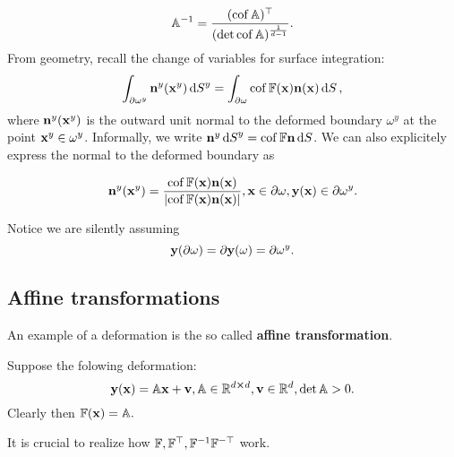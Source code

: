 \documentclass[11pt]{scrartcl} %
\begin{document}
\begin{equation}
    \label{eqn:invbetter}
    \mathbb{A}^{-1} = \frac{(\operatorname{cof} \mathbb{A})^\top}{(\det \operatorname{cof} \mathbb{A})^{\frac{1}{d-1}}}.
\end{equation}
From geometry, recall the change of variables for surface integration:
\[
	\int_{\partial \omega^y}\vb{n}^y\qty(\vb{x}^{y}) \dd{S}^y = \int_{\partial \omega}\operatorname{cof} \mathbb{F}\qty(\vb{x})\vb{n}\qty(\vb{x}) \dd{S},
\]
where $\vb{n}^y\qty(\vb{x}^{y})$ is the outward unit normal to the deformed boundary $\omega^y$ at the point $\vb{x}^{y} \in \omega^{y}$. Informally, we write $\vb{n}^y \dd{S}^y = \operatorname{cof} \mathbb{F} \vb{n} \dd{S}$. We can also explicitely express the normal to the deformed boundary as

\begin{equation}
    \label{eqn:deformed_normal}
    \vb{n}^y(\vb{x}^y)=\frac{\operatorname{cof} \mathbb{F} (\vb{x}) \vb{n}(\vb{x})}{\abs{\operatorname{cof} \mathbb{F}(\vb{x}) \vb{n}(\vb{x})}}, \vb{x} \in \partial \omega, \vb{y}(\vb{x}) \in \partial \omega^y.
\end{equation}

Notice we are silently assuming
\[
	\vb{y}\qty(\partial \omega) = \partial \vb{y}\qty(\omega) = \partial \omega^{y}.
\]

\subsection{Affine transformations}
\label{sec:affine_transf}
An example of a deformation is the so called \textbf{affine transformation}.
\begin{example}
	Suppose the folowing deformation:
	\[
		\vb{y}(\vb{x}) = \mathbb{A} \vb{x} + \vb{v}, \mathbb{A}\in {\mathbb R}^{d \cross d}, \vb{v} \in {\mathbb R}^d, \det \mathbb{A} > 0.
	\]
	Clearly then $\mathbb{F}(\vb{x}) = \mathbb{A}.$
\end{example}
It is crucial to realize how $\mathbb{F}, \mathbb{F}^\top, \mathbb{F}^{-1} \mathbb{F}^{-\top}$ work.
\end{document}

